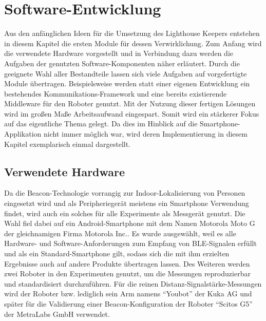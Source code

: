 \chapter{Software-Entwicklung}
Aus den anfänglichen Ideen für die Umsetzung des Lighthouse Keepers entstehen in diesem Kapitel die ersten Module für dessen Verwirklichung. Zum Anfang wird die verwendete Hardware vorgestellt und in Verbindung dazu werden die Aufgaben der genutzten Software-Komponenten näher erläutert. Durch die geeignete Wahl aller Bestandteile lassen sich viele Aufgaben auf vorgefertigte Module übertragen. Beispielsweise werden statt einer eigenen Entwicklung ein bestehendes Kommunikations-Framework und eine bereits existierende Middleware für den Roboter genutzt. Mit der Nutzung dieser fertigen Lösungen wird im großen Maße Arbeitsaufwand eingespart.  Somit wird ein stärkerer Fokus auf das eigentliche Thema gelegt. Da dies im Hinblick auf die Smartphone-Applikation nicht immer möglich war, wird deren Implementierung in diesem Kapitel exemplarisch einmal dargestellt. 
\section{Verwendete Hardware}
Da die Beacon-Technologie vorrangig zur Indoor-Lokalisierung von Personen eingesetzt wird und als Peripheriegerät meistens ein Smartphone Verwendung findet, wird auch ein solches für alle Experimente als Messgerät genutzt. Die Wahl fiel dabei auf ein Android-Smartphone mit dem Namen Motorola Moto G der gleichnamigen Firma Motorola Inc.. Es wurde ausgewählt, weil es alle Hardware- und Software-Anforderungen zum Empfang von BLE-Signalen erfüllt und als ein Standard-Smartphone gilt, sodass sich die mit ihm erzielten Ergebnisse auch auf andere Produkte übertragen lassen. Des Weiteren werden zwei Roboter in den Experimenten genutzt, um die Messungen reproduzierbar und standardisiert durchzuführen. Für die reinen Distanz-Signalstärke-Messungen wird der Roboter bzw. lediglich sein Arm namens "`Youbot"' der Kuka AG und später für die Validierung einer Beacon-Konfiguration der Roboter "`Scitos G5"' der MetraLabs GmbH verwendet. 

